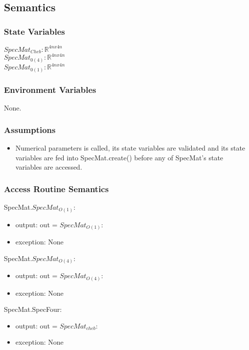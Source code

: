 \documentclass[12pt, titlepage]{article}
\begin{document}
\subsection{Semantics}

\subsubsection{State Variables}
$SpecMat_{Cheb} : \mathbb{R}^{4nx4n}$\\ 
$SpecMat_{0(4)} : \mathbb{R}^{4nx4n}$\\
$SpecMat_{0(1)} : \mathbb{R}^{4nx4n}$

\subsubsection{Environment Variables}

None. 

\subsubsection{Assumptions}

\begin{itemize}
	\item Numerical parameters is called, its state variables are validated and 
	its state variables are fed into SpecMat.create() before any of SpecMat's 
	state variables are accessed. 
\end{itemize}

\subsubsection{Access Routine Semantics}

SpecMat.$SpecMat_{O(1)}:$
\begin{itemize}
	\item output: out = $SpecMat_{O(1)}:$ 
	\item exception: None 
\end{itemize}

\noindent
SpecMat.$SpecMat_{O(4)}:$
\begin{itemize}
	\item output: out = $SpecMat_{O(4)}:$
	\item exception: None
\end{itemize}

\noindent
SpecMat.SpecFour:
\begin{itemize}
	\item output: out = $SpecMat_{cheb}:$
	\item exception: None
\end{itemize}
\end{document}
